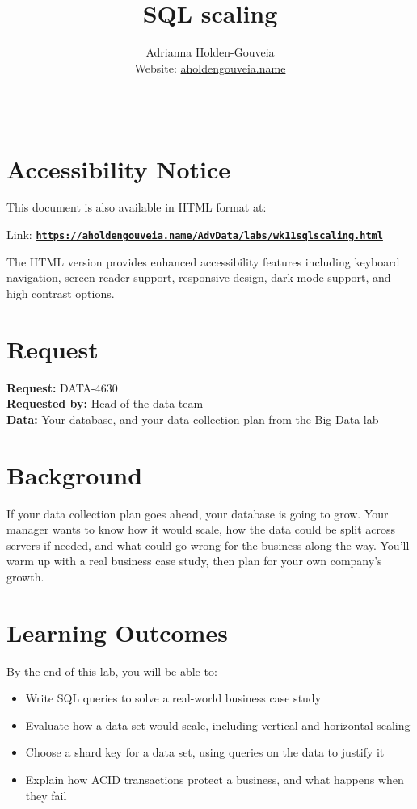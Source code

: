 \documentclass[12pt]{article}
\title{SQL scaling}
\author{
        Adrianna Holden-Gouveia \\
        Website: \href{https://aholdengouveia.name}{aholdengouveia.name}\\ 
        \date{\vspace{-5ex}}
        \faGithub {: aholdengouveia} \\
        }
\begin{document}
    

\maketitle



\section*{Accessibility Notice}
This document is also available in HTML format at:

Link: \href{https://aholdengouveia.name/AdvData/labs/wk11sqlscaling.html}{\textbf{\nolinkurl{https://aholdengouveia.name/AdvData/labs/wk11sqlscaling.html}}}

The HTML version provides enhanced accessibility features including keyboard navigation, screen reader support, responsive design, dark mode support, and high contrast options.

\section*{Request}
\noindent\textbf{Request:} DATA-4630\\
\textbf{Requested by:} Head of the data team\\
\textbf{Data:} Your database, and your data collection plan from the Big Data lab

\section*{Background}
If your data collection plan goes ahead, your database is going to grow. Your manager wants to know how it would scale, how the data could be split across servers if needed, and what could go wrong for the business along the way. You'll warm up with a real business case study, then plan for your own company's growth.

\section*{Learning Outcomes}
By the end of this lab, you will be able to:
\begin{itemize}
    \item Write SQL queries to solve a real-world business case study
    \item Evaluate how a data set would scale, including vertical and horizontal scaling
    \item Choose a shard key for a data set, using queries on the data to justify it
    \item Explain how ACID transactions protect a business, and what happens when they fail
\end{itemize}
\end{document}

